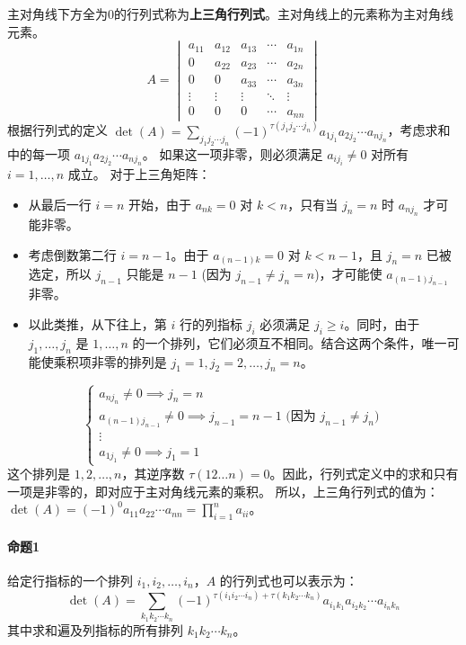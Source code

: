 \documentclass[10pt, a4paper, oneside, UTF8]{ctexbook}
\begin{document}
主对角线下方全为0的行列式称为\textbf{上三角行列式}。主对角线上的元素称为主对角线元素。
\[
  A =
  \begin{vmatrix}
    a_{11} & a_{12} & a_{13} & \cdots & a_{1n} \\
    0      & a_{22} & a_{23} & \cdots & a_{2n} \\
    0      & 0      & a_{33} & \cdots & a_{3n} \\
    \vdots & \vdots & \vdots & \ddots & \vdots \\
    0      & 0      & 0      & \cdots & a_{nn}
  \end{vmatrix}
\]
根据行列式的定义 $\det(A) = \sum_{j_1j_2 \cdots j_n} (-1)^{\tau(j_1j_2 \cdots
j_n)} a_{1j_1}a_{2j_2}\cdots a_{nj_n}$，考虑求和中的每一项
$a_{1j_1}a_{2j_2}\cdots a_{nj_n}$。
如果这一项非零，则必须满足 $a_{ij_i} \neq 0$ 对所有 $i=1, \dots, n$ 成立。
对于上三角矩阵：
\begin{itemize}
  \item 从最后一行 $i=n$ 开始，由于 $a_{n k} = 0$ 对 $k < n$，只有当 $j_n=n$ 时
    $a_{nj_n}$ 才可能非零。
  \item 考虑倒数第二行 $i=n-1$。由于 $a_{(n-1)k} = 0$ 对 $k < n-1$，且 $j_n=n$
    已被选定，所以 $j_{n-1}$ 只能是 $n-1$ (因为 $j_{n-1} \neq j_n=n$)，才可能使
    $a_{(n-1)j_{n-1}}$ 非零。
  \item 以此类推，从下往上，第 $i$ 行的列指标 $j_i$ 必须满足 $j_i \ge i$。同时，由于 $j_1,
    \dots, j_n$ 是 $1, \dots, n$ 的一个排列，它们必须互不相同。结合这两个条件，唯一可能使乘积项非零的排列是
    $j_1=1, j_2=2, \dots, j_n=n$。
\end{itemize}
\[
  \begin{cases}
    a_{nj_n} \neq 0 \implies j_n = n \\
    a_{(n-1)j_{n-1}} \neq 0 \implies j_{n-1} = n-1 \text{ (因为 }
    j_{n-1} \neq j_n \text{)} \\
    \vdots \\
    a_{1j_1} \neq 0 \implies j_1 = 1
  \end{cases}
\]
这个排列是 $1, 2, \dots, n$，其逆序数 $\tau(12\dots n) =
0$。因此，行列式定义中的求和只有一项是非零的，即对应于主对角线元素的乘积。
所以，上三角行列式的值为：$\det(A) = (-1)^0 a_{11}a_{22}\cdots a_{nn} =
\prod_{i=1}^{n} a_{ii}$。

\paragraph{命题1}
给定行指标的一个排列 $i_1, i_2, \dots, i_n$，$A$ 的行列式也可以表示为：
\[
  \det(A) = \sum_{k_1k_2 \cdots k_n} (-1)^{\tau(i_1i_2 \cdots i_n) +
  \tau(k_1k_2 \cdots k_n)} a_{i_1k_1}a_{i_2k_2}\cdots a_{i_nk_n}
\]
其中求和遍及列指标的所有排列 $k_1k_2 \cdots k_n$。
\end{document}
